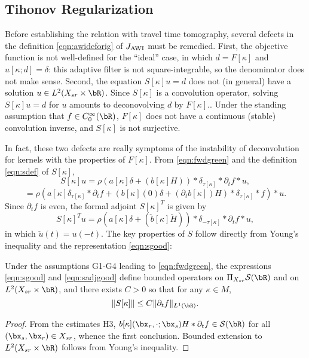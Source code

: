 \subsection{Tihonov Regularization}
Before establishing the relation with travel time tomography, several
defects in the definition \ref{eqn:awideforig} of $J_{\rm AWI}$ must be
remedied. First, the objective function is not well-defined for the
``ideal'' case, in which $d = F[\kappa]$ and $u[\kappa;d]=\delta$:
this adaptive filter is not square-integrable, so the denominator does
not make sense. Second, the equation $S[\kappa]u=d$ does not (in
general) have a solution $u \in L^2(X_{sr} \times \bR)$. Since
$S[\kappa]$ is a convolution operator, solving $S[\kappa]u=d$ for $u$
amounts to deconovolving $d$ by $F[\kappa]$..  Under the standing
assumption that $f \in C^{\infty}_0(\bR)$, $F[\kappa]$ does not have a continuous
(stable) convolution inverse, and $S[\kappa]$ is not surjective.

In fact, these two defects are really symptoms of the instability of
deconvolution for kernels with the properties of $F[\kappa]$.  From \ref{eqn:fwdgreen} and the
definition \ref{eqn:sdef} of  $S[\kappa]$,
\[
  S[\kappa]u = \rho( a[\kappa]\delta    +  (b[\kappa]H)) *\delta_{\tau[\kappa]}*\partial_t f *u,
\]
\begin{equation}
  \label{eqn:sgood}
  = \rho(a[\kappa]\delta_{\tau[\kappa]}*\partial_t f +
  (b[\kappa](0)\delta + (\partial_t b[\kappa])H)
  *\delta_{\tau[\kappa]}*f) * u.
\end{equation}
Since $\partial_t f$ is even, the formal adjoint $S[\kappa]^T$ is given by
\begin{equation}
  \label{eqn:sadjgood}
  S[\kappa]^Tu = \rho( a[\kappa]\delta    +  (\check{b}[\kappa]\check{H}))
  *\delta_{-\tau[\kappa]}*\partial_t f *u,
\end{equation}
in which $\check{u}(t) = u(-t)$.
The key properties of $S$ follow directly from Young's inequality and
the representation \ref{eqn:sgood}:
\begin{lemma}
  \label{thm:snorm}
  Under the assumptions G1-G4 leading to \ref{eqn:fwdgreen}, the
  expressions \ref{eqn:sgood} and \ref{eqn:sadjgood} define
  bounded operators on
  $\Pi_{X_{sr}} {\cal S}(\bR)$ and on
  $L^2(X_{sr} \times \bR)$, and there exists $C>0$ so
  that for any $\kappa \in M$,
  \begin{equation}
    \label{eqn:snorm}
    \|S[\kappa]\| \le C\|\partial_t f\|_{L^1(\bR)}.
  \end{equation}
\end{lemma}
\begin{proof} From the estimates H3, $b[\kappa](\bx_r,\cdot;\bx_s)H *
  \partial_tf \in {\cal S}(\bR)$ for all $(\bx_s,\bx_r) \in X_{sr}$,
  whence the first conclusion. Bounded extension to $L^2(X_{sr} \times
  \bR)$ follows from Young's inequality.
\end{proof}
  

